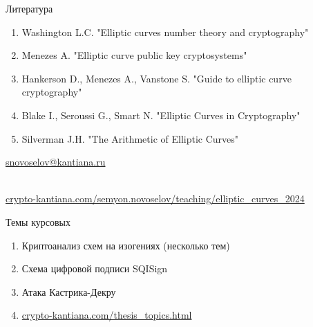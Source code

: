 \documentclass{beamer}
\begin{document}
\begin{frame}{Литература}
\begin{enumerate}
    \item Washington L.C. "Elliptic curves number theory and cryptography"%
    \item Menezes A. "Elliptic curve public key cryptosystems"
    \item Hankerson D., Menezes A., Vanstone S. "Guide to elliptic curve cryptography"
    \item Blake I., Seroussi G., Smart N. "Elliptic Curves in Cryptography"
    \item Silverman J.H. "The Arithmetic of Elliptic Curves"%
\end{enumerate}


\begin{center}
    \begin{tcolorbox}[enhanced,hbox,colback=block-green-color-bg,colframe=subsection-color!120,title=Контакты,center title]
        \begin{varwidth}{\textwidth}
            \begin{center}
                \href{mailto:snovoselov@kantiana.ru}{snovoselov@kantiana.ru}
            \end{center}
        \end{varwidth}
    \end{tcolorbox}	
\end{center}

\\
{\footnotesize
    \href{https://crypto-kantiana.com/semyon.novoselov/teaching/elliptic_curves_2024}{crypto-kantiana.com/semyon.novoselov/teaching/elliptic\_curves\_2024}
}
\end{frame}

\begin{frame}{Темы курсовых}
	\begin{enumerate}
		\item Криптоанализ схем на изогениях (несколько тем)
		\item Схема цифровой подписи SQISign
		\item Атака Кастрика-Декру
		\item \href{https://crypto-kantiana.com/thesis_topics.html}{crypto-kantiana.com/thesis\_topics.html}
	\end{enumerate}
\end{frame}
\end{document}
